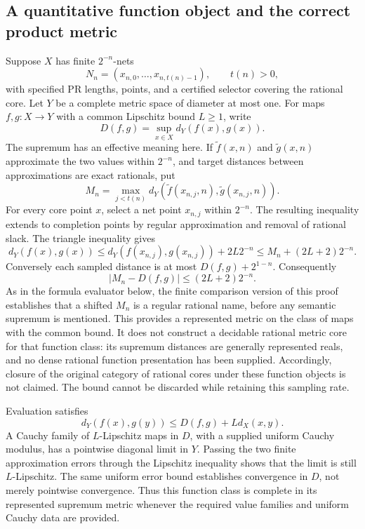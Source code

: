 \subsection{A quantitative function object and the correct product metric}

Suppose $X$ has finite $2^{-n}$-nets
\[
 N_n=(x_{n,0},\ldots,x_{n,t(n)-1}),\qquad t(n)>0,
\]
with specified PR lengths, points, and a certified selector covering the
rational core. Let $Y$ be a complete metric space of diameter at most one.
For maps $f,g:X\to Y$ with a common Lipschitz bound $L\geq 1$, write
\[
 D(f,g)=\sup_{x\in X}d_Y(f(x),g(x)).
\]
The supremum has an effective meaning here. If $\widetilde f(x,n)$ and
$\widetilde g(x,n)$ approximate the two values within $2^{-n}$, and target
distances between approximations are exact rationals, put
\[
 M_n=\max_{j<t(n)}
 d_Y(\widetilde f(x_{n,j},n),\widetilde g(x_{n,j},n)).
\]
For every core point $x$, select a net point $x_{n,j}$ within $2^{-n}$.
The resulting inequality extends to completion points by regular
approximation and removal of rational slack. The triangle inequality gives
\[
 d_Y(f(x),g(x))
 \leq d_Y(f(x_{n,j}),g(x_{n,j}))+2L2^{-n}
 \leq M_n+(2L+2)2^{-n}.
\]
Conversely each sampled distance is at most $D(f,g)+2^{1-n}$. Consequently
\begin{equation}
 |M_n-D(f,g)|\leq (2L+2)2^{-n}.
 \label{eq:cat-sup-distance}
\end{equation}
As in the formula evaluator below, the finite comparison version of this
proof establishes that a shifted $M_n$ is a regular rational name, before any
semantic supremum is mentioned. This provides a represented metric on the
class of maps with the common bound. It does not construct a decidable
rational metric core for that function class: its supremum distances are
generally represented reals, and no dense rational function presentation has
been supplied. Accordingly, closure of the original category of rational
cores under these function objects is not claimed. The bound cannot be
discarded while retaining this sampling rate.

Evaluation satisfies
\begin{equation}
 d_Y(f(x),g(y))\leq D(f,g)+L d_X(x,y).
 \label{eq:cat-eval}
\end{equation}
A Cauchy family of $L$-Lipschitz maps in $D$, with a supplied uniform Cauchy
modulus, has a pointwise diagonal limit in $Y$. Passing the two finite
approximation errors through the Lipschitz inequality shows that the limit
is still $L$-Lipschitz. The same uniform error bound establishes convergence
in $D$, not merely pointwise convergence. Thus this function class is
complete in its represented supremum metric whenever the required value
families and uniform Cauchy data are provided.

